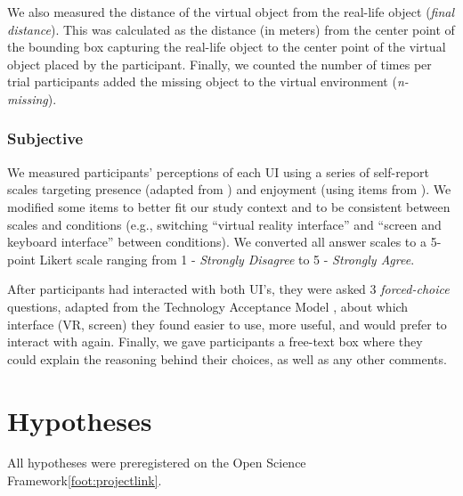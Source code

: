 \documentclass[letterpaper, 10 pt, conference]{ieeeconf}  %
\begin{document}
We also measured the distance of the virtual object from the real-life object (\textit{final distance}). This was calculated as the distance (in meters) from the center point of the bounding box capturing the real-life object to the center point of the virtual object placed by the participant. Finally, we counted the number of times per trial participants added the missing object to the virtual environment (\textit{n-missing}).


\subsubsection{Subjective} %
We measured participants' perceptions of each UI using a series of self-report scales targeting presence (adapted from \cite{witmer1998measuring}) and enjoyment (using items from \cite{diefenbach2014hedonic}). We modified some items to better fit our study context and to be consistent between scales and conditions (e.g., switching ``virtual reality interface'' and ``screen and keyboard interface'' between conditions). We converted all answer scales to a 5-point Likert scale ranging from 1 - \textit{Strongly Disagree} to 5 - \textit{Strongly Agree}. 

After participants had interacted with both UI's, they were asked 3 \textit{forced-choice} questions, adapted from the Technology Acceptance Model \cite{venkatesh2012consumer}, about which interface  (VR, screen) they found easier to use, more useful, and would prefer to interact with again. Finally, we gave participants a free-text box where they could explain the reasoning behind their choices, as well as any other comments.



\section{Hypotheses}
All hypotheses were preregistered on the Open Science Framework\cref{foot:projectlink}.
\end{document}
